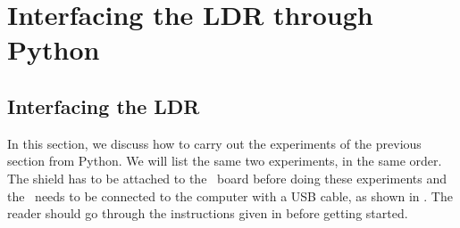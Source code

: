 \section{Interfacing the LDR through Python}
\subsection{Interfacing the LDR}
In this section, we discuss how to carry out the experiments of the
previous section from Python.  We will list the same two experiments,
in the same order.  The shield has to be attached to the \arduino\ board
before doing these experiments and the \arduino\ needs to be connected to the computer 
with a USB cable, as shown in .
The reader should go through the instructions given in
 before getting started.

